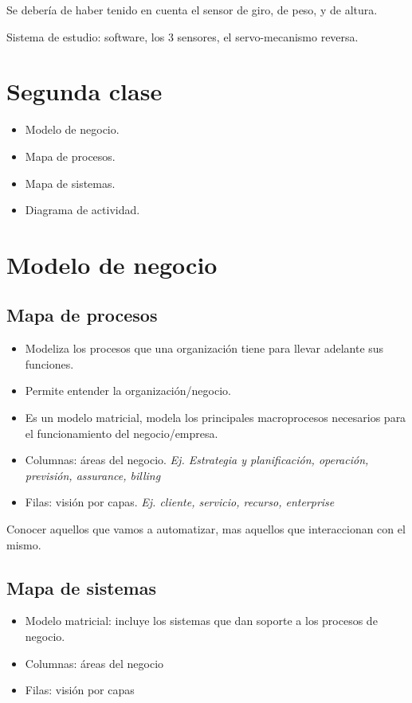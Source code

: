 \documentclass[titlepage,a4paper]{article}
\begin{document}
Se debería de haber tenido en cuenta el sensor de giro, de peso, y de altura.

Sistema de estudio: software, los 3 sensores, el servo-mecanismo reversa.


\section*{Segunda clase}

    \begin{itemize}
        \item Modelo de negocio.
        \item Mapa de procesos.
        \item Mapa de sistemas.
        \item Diagrama de actividad.
    \end{itemize}

\section{Modelo de negocio}

\subsection{Mapa de procesos}
    \begin{itemize}
        \item Modeliza los procesos que una organización tiene para llevar adelante sus funciones.
        \item Permite entender la organización/negocio.
        \item Es un modelo matricial, modela los principales macroprocesos necesarios para el funcionamiento del negocio/empresa.
        \item Columnas: áreas del negocio. \textit{Ej. Estrategia y planificación, operación, previsión, assurance, billing}
        \item Filas: visión por capas. \textit{Ej. cliente, servicio, recurso, enterprise}
    \end{itemize}
    
    
    Conocer aquellos que vamos a automatizar, mas aquellos que interaccionan con el mismo.
    
\subsection{Mapa de sistemas}
    \begin{itemize}
        \item Modelo matricial: incluye los sistemas que dan soporte a los procesos de negocio.
        \item Columnas: áreas del negocio
        \item Filas: visión por capas
    \end{itemize}
\end{document}
